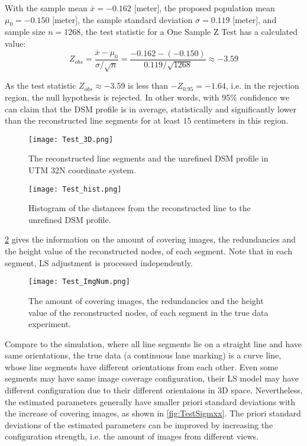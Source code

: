 With the sample mean $\overline{x}=-0.162$ [meter],
the proposed population mean $\mu_0=-0.150$ [meter],
the sample standard deviation $\sigma=0.119$ [meter],
and sample size $n=1268$, the test statistic for a One Sample Z Test has a calculated value:
\begin{equation*}
Z_{obs} = \frac{\overline{x}-\mu_0}{\sigma/\sqrt{n}}=\frac{-0.162-(-0.150)}{0.119/\sqrt{1268}}\approx-3.59
\end{equation*}

As the test statistic $Z_{obs}\approx-3.59$ is less than $-Z_{0.95}=-1.64$, i.e. in the rejection region, the null hypothesis is rejected. In other words, {with 95\% confidence we can claim that the DSM profile is in average, statistically and significantly lower than the reconstructed line segments for at least $15$ centimeters in this region}. %

\begin{figure}
  \centering
  \texttt{[image: Test\_3D.png]}
  \caption{\small The reconstructed line segments and the unrefined DSM profile in UTM 32N coordinate system.}
  \label{fig:Test3D}
  \vspace{2cm}
  \texttt{[image: Test\_hist.png]}
  \caption{\small Histogram of the distances from the reconstructed line to the unrefined DSM profile.}
  \label{fig:TestHist}
\end{figure}

\clearpage

\cref{fig:TestImgNum} gives the information on the amount of covering images, the redundancies and the height value of the reconstructed nodes, of each segment. Note that in each segment, LS adjustment is processed independently.

\begin{figure}
  \centering
  \texttt{[image: Test\_ImgNum.png]}
  \caption{\small The amount of covering images, the redundancies and the height value of the reconstructed nodes, of each segment in the true data experiment.}
  \label{fig:TestImgNum}
\end{figure}




Compare to the simulation, where all line segments lie on a straight line and have same orientations, the true data (a continuous lane marking) is a curve line, whose line segments have different orientations from each other. Even some segments may have same image coverage configuration, their LS model may have different configuration due to their different orientaions in 3D space. Nevertheless, the estimated parameters generally have smaller priori standard deviations with the increase of covering images, as shown in \cref{fig:TestSigmxx}. The priori standard deviations of the estimated parameters can be improved by increasing the configuration strength, i.e. the amount of images from different views.

